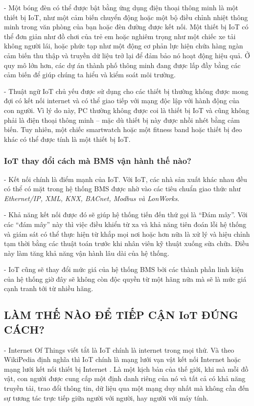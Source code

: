 	- Một bóng đèn có thể được bật bằng ứng dụng điện thoại thông minh là một thiết bị IoT, như một cảm biến chuyển động hoặc một bộ điều chỉnh nhiệt thông minh trong văn phòng của bạn hoặc đèn đường được kết nối. Một thiết bị IoT có thể đơn giản như đồ chơi của trẻ em hoặc nghiêm trọng như một chiếc xe tải không người lái, hoặc phức tạp như một động cơ phản lực hiện chứa hàng ngàn cảm biến thu thập và truyền dữ liệu trở lại để đảm bảo nó hoạt động hiệu quả. Ở quy mô lớn hơn, các dự án thành phố thông minh đang được lấp đầy bằng các cảm biến để giúp chúng ta hiểu và kiểm soát môi trường.

	- Thuật ngữ IoT chủ yếu được sử dụng cho các thiết bị thường không được mong đợi có kết nối internet và có thể giao tiếp với mạng độc lập với hành động của con người. Vì lý do này, PC thường không được coi là thiết bị IoT và cũng không phải là điện thoại thông minh – mặc dù thiết bị này được nhồi nhét bằng cảm biến. Tuy nhiên, một chiếc smartwatch hoặc một fitness band hoặc thiết bị đeo khác có thể được tính là một thiết bị IoT.
	
	\subsubsection{IoT thay đổi cách mà BMS vận hành thế nào?}
	- Kết nối chính là điểm mạnh của IoT. Với IoT, các nhà sản xuất khác nhau đều có thể có mặt trong hệ thống BMS được nhờ vào các tiêu chuẩn giao thức như \emph{Ethernet/IP, XML, KNX, BACnet, Modbus và LonWorks}. 

	- Khả năng kết nối được đó sẽ giúp hệ thống tiến đến thứ gọi là ``Đám mây''. Với các ``đám mây'' này thì việc điều khiển từ xa và khả năng tiên đoán lỗi hệ thống và giám sát có thể thực hiện từ khắp mọi nơi hoặc hơn nữa là xử lý và hiệu chỉnh tạm thời bằng các thuật toán trước khi nhân viên kỹ thuật xuống sửa chữa. Điều này làm tăng khả năng vận hành lâu dài của hệ thống.
	
	- IoT cũng sẽ thay đổi mức giá của hệ thống BMS bởi các thành phần linh kiện của hệ thống giờ đây sẽ không còn độc quyền từ một hãng nữa mà sẽ là mức giá cạnh tranh tới từ nhiều hãng.
	
	\subsection{LÀM THẾ NÀO ĐỂ TIẾP CẬN IoT ĐÚNG CÁCH?}
	- Internet Of Things viết tắt là IoT chính là internet trong mọi thứ. Và theo WikiPedia định nghĩa thì IoT chính là mạng lưới vạn vật kết nối Internet hoặc mạng lưới kết nối thiết bị Internet . Là một kịch bản của thế giới, khi mà mỗi đồ vật, con người được cung cấp một định danh riêng của nó và tất cả có khả năng truyền tải, trao đổi thông tin, dữ liệu qua một mạng duy nhất mà không cần đến sự tương tác trực tiếp giữa người với người, hay người với máy tính.
	
